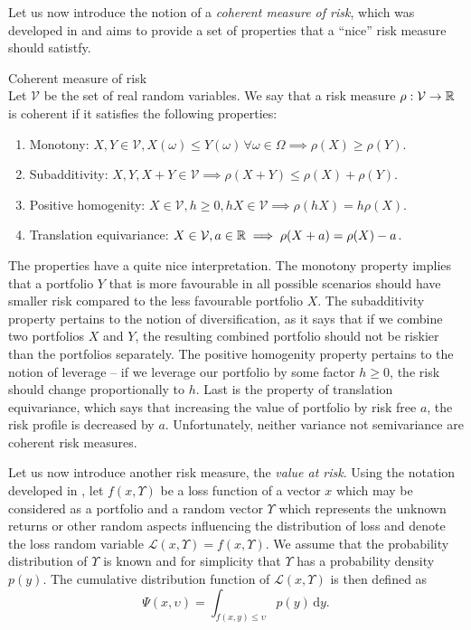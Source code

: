 Let us now introduce the notion of a \textit{coherent measure of risk}, which was developed in \cite[Defintion 2.4.]{coherent_measures_of_risk} and aims to provide a set of properties that a “nice” risk measure should satistfy.
\begin{defn}{Coherent measure of risk} \\
Let $\mathcal{V}$ be the set of real random variables. We say that a risk measure $\rho: \mathcal{V} \rightarrow \mathbb{R}$ is coherent if it satisfies the following properties:
\begin{enumerate}
	\item Monotony: $X, Y \in \mathcal{V}, X(\omega) \leq Y(\omega) \, \forall \omega \in \Omega \implies \rho(X) \geq \rho(Y)$.
	\item Subadditivity: $X, Y, X+Y \in \mathcal{V} \implies \rho(X+	Y) \leq \rho(X) + \rho(Y)$.
	\item Positive homogenity: $X \in \mathcal{V}, h \geq 0, hX \in \mathcal{V} \implies \rho(hX)=h\rho(X)$.
	\item Translation equivariance: $X \in \mathcal{V}, a \in \mathbb{R} \implies \rho(X+a)=\rho(X)-a$.
\end{enumerate}
\end{defn}
The properties have a quite nice interpretation. The monotony property implies that a portfolio $Y$ that is more favourable in all possible scenarios should have smaller risk compared to the less favourable portfolio $X$. The subadditivity property pertains to the notion of diversification, as it says that if we combine two portfolios $X$ and $Y$, the resulting combined portfolio should not be riskier than the portfolios separately. The positive homogenity property pertains to the notion of leverage -- if we leverage our portfolio by some factor $h\geq0$, the risk should change proportionally to $h$. Last is the property of translation equivariance, which says that increasing the value of portfolio by risk free $a$, the risk profile is decreased by $a$.  Unfortunately, neither variance not semivariance are coherent risk measures.

Let us now introduce another risk measure, the \textit{value at risk}.
Using the notation developed in \cite{cornuejols_tutuncu_2006}, let $f(x,\Upsilon)$ be a loss function of a vector $x$ which may be considered as a portfolio and a random vector $\Upsilon$ which represents the unknown returns or other random aspects influencing the distribution of loss and denote the loss random variable $\mathcal{L}(x,\Upsilon)=f(x,\Upsilon)$. We assume that the probability distribution of $\Upsilon$ is known and for simplicity that $\Upsilon$ has a probability density $p(y)$. The cumulative distribution function of $\mathcal{L}(x,\Upsilon)$ is then defined as
\begin{equation*}
\Psi(x,\upsilon)=\int_{f(x,y) \leq \upsilon} p(y) \, \mathrm{d}y.
\end{equation*}

